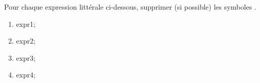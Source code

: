 \documentclass[exercice]{thedocument}%
\begin{document}
%
Pour chaque expression littérale ci-dessous, supprimer (si
possible) les symboles \guillemets{$\times$}.
\begin{enumerate}
    \item \<expr1;
    \item \<expr2;
    \item \<expr3;
    \item \<expr4;
\end{enumerate}
\end{document}
